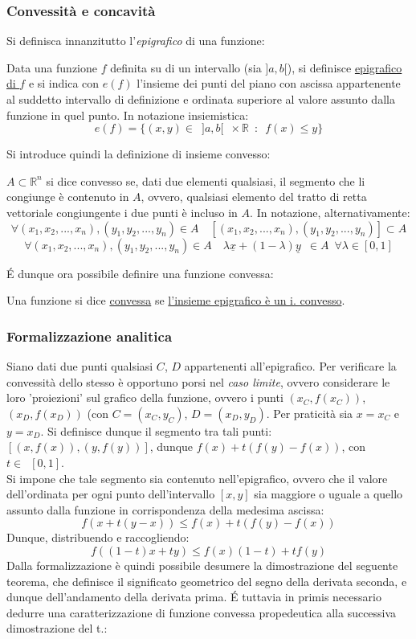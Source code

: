 \documentclass[10pt, oneside]{book}
\theoremstyle{plain}
\begin{document}
\subsubsection{Convessità e concavità}
Si definisca innanzitutto l'\textit{epigrafico} di una funzione:
\begin{defin}
Data una funzione $f$ definita su di un intervallo (sia $]a, b[$), si definisce \underline{epigrafico di $f$} e si indica con $e(f)$ l'insieme dei punti del piano con ascissa appartenente al suddetto intervallo di definizione e ordinata superiore al valore assunto dalla funzione in quel punto. In notazione insiemistica:
\[e(f) = \{(x,y) \in \enspace ]a, b[ \enspace \times \mathbb{R} \enspace : \enspace f(x) \leq y\}\]
\end{defin}
Si introduce quindi la definizione di insieme convesso:
\begin{defin}
$A \subset \mathbb{R}^n$ si dice convesso se, dati due elementi qualsiasi, il segmento che li congiunge è contenuto in $A$, ovvero, qualsiasi elemento del tratto di retta vettoriale congiungente i due punti è incluso in $A$. In notazione, alternativamente:
\[\forall (x_1, x_2, ..., x_n), (y_1, y_2, ..., y_n) \in A \quad [(x_1, x_2, ..., x_n), (y_1, y_2, ..., y_n)] \subset A\]
\[\forall (x_1, x_2, ..., x_n), (y_1, y_2, ..., y_n) \in A \quad \lambda \underline{x} + (1-\lambda) \underline{y} \enspace \in A \enspace \forall \lambda \in [0,1]\]
\end{defin}
\'E dunque ora possibile definire una funzione convessa:
\begin{defin}
Una funzione si dice \underline{convessa} se \underline{l'insieme epigrafico è un i. convesso}.
\end{defin}
\subsubsection{Formalizzazione analitica}
Siano dati due punti qualsiasi $C$, $D$ appartenenti all'epigrafico. Per verificare la convessità dello stesso è opportuno porsi nel \textit{caso limite}, ovvero considerare le loro 'proiezioni' sul grafico della funzione, ovvero i punti $(x_C, f(x_C))$, $(x_D, f(x_D))$ (con $C = (x_C, y_C)$, $D = (x_D, y_D)$. Per praticità sia $x = x_C$ e $y = x_D$. Si definisce dunque il segmento tra tali punti: $[(x, f(x)), (y, f(y))]$, dunque $f(x) + t (f(y) - f(x))$, con $t \in \enspace [0, 1]$.\\
Si impone che tale segmento sia contenuto nell'epigrafico, ovvero che il valore dell'ordinata per ogni punto dell'intervallo $[x, y]$ sia maggiore o uguale a quello assunto dalla funzione in corrispondenza della medesima ascissa:
\[f(x + t (y - x)) \leq f(x) + t (f(y) - f(x))\]
Dunque, distribuendo e raccogliendo:
\[f((1-t) x + t y) \leq f(x) (1-t) + t f(y)\]
Dalla formalizzazione è quindi possibile desumere la dimostrazione del seguente teorema, che definisce il significato geometrico del segno della derivata seconda, e dunque dell'andamento della derivata prima. \'E tuttavia in primis necessario dedurre una caratterizzazione di funzione convessa propedeutica alla successiva dimostrazione del t.:
\end{document}
